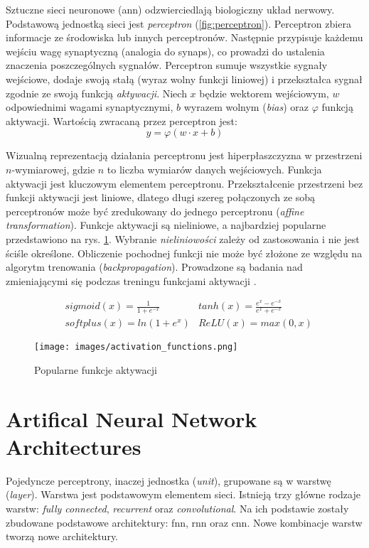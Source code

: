 Sztuczne sieci neuronowe (\acrshort{ann}) odzwierciedlają biologiczny układ nerwowy. Podstawową jednostką sieci jest \emph{perceptron} (\ref{fig:perceptron}). Perceptron zbiera informacje ze środowiska lub innych perceptronów. Następnie przypisuje każdemu wejściu wagę synaptyczną (analogia do synaps), co prowadzi do ustalenia znaczenia poszczególnych sygnałów. Perceptron sumuje wszystkie sygnały wejściowe, dodaje swoją stałą (wyraz wolny funkcji liniowej) i przekształca sygnał zgodnie ze swoją funkcją \emph{aktywacji}. Niech $x$ będzie wektorem wejściowym, $w$ odpowiednimi wagami synaptycznymi, $b$ wyrazem wolnym (\emph{bias}) oraz $\varphi$ funkcją aktywacji. Wartością zwracaną przez perceptron jest:
\begin{equation} \label{eq:perceptron}
y=\varphi(w \cdot x + b) 
\end{equation}

Wizualną reprezentacją działania perceptronu jest hiperpłaszczyzna w przestrzeni $n$-wymiarowej, gdzie $n$ to liczba wymiarów danych wejściowych. Funkcja aktywacji jest kluczowym elementem perceptronu. Przekształcenie przestrzeni bez funkcji aktywacji jest liniowe, dlatego długi szereg połączonych ze sobą perceptronów może być zredukowany do jednego perceptronu (\textit{affine transformation}). Funkcje aktywacji są nieliniowe, a najbardziej popularne przedstawiono na rys. \ref{fig:activation_fun}. Wybranie \emph{nieliniowości} zależy od zastosowania i nie jest ściśle określone. Obliczenie pochodnej funkcji nie może być złożone ze względu na algorytm trenowania (\textit{backpropagation}). Prowadzone są badania nad zmieniającymi się podczas treningu funkcjami aktywacji \cite{activation_func_train}. 

\begin{align*}
&sigmoid(x) =  \frac {1} {1 + e^{-x}} &tanh(x) = \frac {e^x - e^{-x}} {e^x + e^{-x}}\\
&softplus(x) = ln(1 + e^x) &ReLU(x) = max(0, x)
\end{align*}

\begin{figure}
    \centering
    \texttt{[image: images/activation\_functions.png]}
    \caption{Popularne funkcje aktywacji \cite{activation_func_train}}
    \label{fig:activation_fun}
\end{figure}

\section{Artifical Neural Network Architectures}
Pojedyncze perceptrony, inaczej jednostka (\textit{unit}), grupowane są w warstwę (\textit{layer}). Warstwa jest podstawowym elementem sieci. Istnieją trzy główne rodzaje warstw: \textit{fully connected}, \textit{recurrent} oraz \textit{convolutional}. Na ich podstawie zostały zbudowane podstawowe architektury: \acrfull{fnn},  \acrfull{rnn} oraz \acrfull{cnn}. Nowe kombinacje warstw tworzą nowe architektury.

